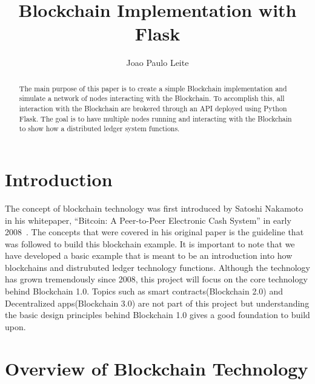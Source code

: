 
\title{Blockchain Implementation with Flask}


\author{Joao Paulo Leite}

\renewcommand{\shortauthors}{J. P. Leite}


\begin{abstract}
The main purpose of this paper is to create a simple Blockchain implementation and simulate a 
network of nodes interacting with the Blockchain. To accomplish this, all 
interaction with the Blockchain are brokered through an API deployed using 
Python Flask. The goal is to have multiple nodes running and interacting with 
the Blockchain to show how a distributed ledger system functions.

\end{abstract}



\maketitle

\section{Introduction}

The concept of blockchain technology was first introduced by Satoshi Nakamoto in
his whitepaper, “Bitcoin: A Peer-to-Peer Electronic Cash System” in early 2008~\cite{hid-sp18-414-www-blockchain-theory-application}. 
The concepts that were covered in his original paper is the guideline that was 
followed to build this blockchain example. It is important to note that we have 
developed a basic example that is meant to be an introduction into how 
blockchains and distrubuted ledger technology functions. Although the 
technology has grown tremendously since 2008, this project will focus on the 
core technology behind Blockchain 1.0. Topics such as smart 
contracts(Blockchain 2.0) and Decentralized apps(Blockchain 3.0) are not part of 
this project but understanding the basic design principles behind Blockchain 1.0 
gives a good foundation to build upon. 

\section{Overview of Blockchain Technology}

